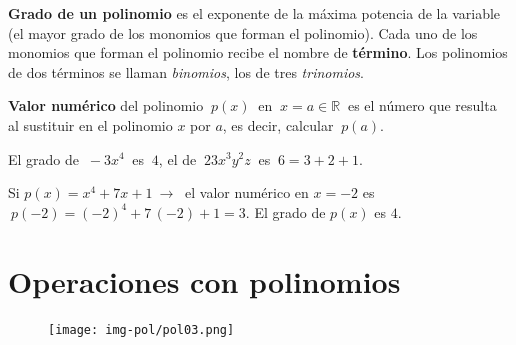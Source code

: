 \vspace{3mm}
\begin{definition}

\vspace{2mm}\textbf{Grado de un polinomio} es el exponente de la máxima potencia de la variable (el mayor grado de los monomios que forman el polinomio).
Cada uno de los monomios que forman el polinomio recibe el nombre de \textbf{término}. Los polinomios de dos términos se llaman \emph{binomios}, los de tres \emph{trinomios}.
\end{definition}


\vspace{3mm}
\begin{definition}

\textbf{Valor numérico} del polinomio $\ p(x) \ $ en $\ x=a\in \mathbb R\ $ es el número que resulta al sustituir en el polinomio $x$ por $a$, es decir, calcular $\ p(a)$.	
\end{definition}

\vspace{5mm}

\begin{miejemplo}

El grado de $\ -3x^4\ $ es $\ 4$, el de $\ 23x^3y^2z \ $ es $\ 6=3+2+1$.

\vspace{2mm} Si $p(x)=x^4+7x+1 \ \to \ $ el valor numérico en $x=-2$ es $\ p(-2)=(-2)^4+7\, (-2)+1=3$. El grado de $p(x)$ es $4$.
\end{miejemplo}

\vspace{1cm}
\section{Operaciones con polinomios}

\vspace{0.5cm}


\begin{figure}[H]
	\centering
	\texttt{[image: img-pol/pol03.png]}
\end{figure}



\vspace{0.75cm}

